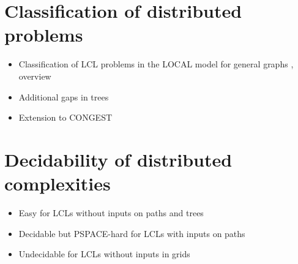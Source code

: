 \documentclass[a4paper,11pt]{article}
\begin{document}
\section{Classification of distributed problems}
\begin{itemize}
    \item Classification of LCL problems in the LOCAL model for general graphs \cite{
        cole-vishkin-1986-deterministic-coin-tossing-with,
        naor-1991-a-lower-bound-on-probabilistic-algorithms-for,
        linial-1992-locality-in-distributed-graph-algorithms,
        naor-stockmeyer-1995-what-can-be-computed-locally,
        brandt-fischer-etal-2016-a-lower-bound-for-the,
        fischer-ghaffari-2017-sublogarithmic-distributed,
        ghaffari-harris-kuhn-2018-on-derandomizing-local,
        balliu-hirvonen-etal-2018-new-classes-of-distributed,
        chang-pettie-2019-a-time-hierarchy-theorem-for-the,
        chang-kopelowitz-pettie-2019-an-exponential-separation,
        rozhon-ghaffari-2020-polylogarithmic-time-deterministic,
        balliu-brandt-etal-2020-how-much-does-randomness-help,
        balliu-brandt-etal-2021-almost-global-problems-in-the
    }, overview \cite{suomela-2020-landscape-of-locality-invited-talk}
    \item Additional gaps in trees \cite{chang-2020-the-complexity-landscape-of-distributed,balliu-brandt-etal-2021-almost-global-problems-in-the,grunau-rozhon-brandt-2022-the-landscape-of-distributed}
    \item Extension to CONGEST \cite{balliu-censor-hillel-etal-2021-locally-checkable}
\end{itemize}

\section{Decidability of distributed complexities}
\begin{itemize}
    \item Easy for LCLs without inputs on paths \cite{chang-studeny-suomela-2023-distributed-graph-problems,brandt-hirvonen-etal-2017-lcl-problems-on-grids} and trees \cite{balliu-brandt-etal-2022-efficient-classification-of}
    \item Decidable but PSPACE-hard for LCLs with inputs on paths \cite{balliu-brandt-etal-2019-the-distributed-complexity-of}
    \item Undecidable for LCLs without inputs in grids \cite{naor-stockmeyer-1995-what-can-be-computed-locally,brandt-hirvonen-etal-2017-lcl-problems-on-grids}
\end{itemize}
\end{document}
